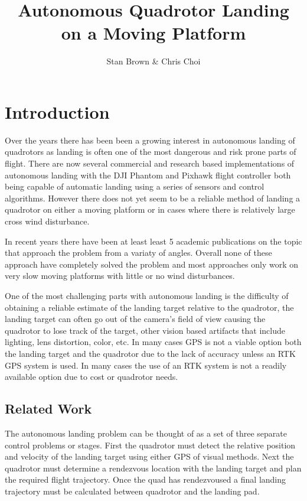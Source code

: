 \documentclass[11pt, twocolumn]{article}
\begin{document}
\title{Autonomous Quadrotor Landing on a Moving Platform}
\author{Stan Brown \& Chris Choi}
\date{}
\maketitle

\section{Introduction}
Over the years there has been been a growing interest in autonomous landing of quadrotors as landing is often one of the most dangerous and risk prone parts of flight. There are now several commercial and research based implementations of autonomous landing with the DJI Phantom and Pixhawk flight controller both being capable of automatic landing using a series of sensors and control algorithms. However there does not yet seem to be a reliable method of landing a quadrotor on either a moving platform or in cases where there is relatively large cross wind disturbance. 

In recent years there have been at least least 5 academic publications on the topic \cite{Lee2012, Kim2014, Voos2010, Friis2009, Ling2014, Herisse2012} that approach the problem from a variaty of angles. Overall none of these approach have completely solved the problem and most approaches only work on very slow moving platforms with little or no wind disturbances. 

One of the most challenging parts with autonomous landing is the difficulty of obtaining a reliable estimate of the landing target relative to the quadrotor, the landing target can often go out of the camera's field of view causing the quadrotor to lose track of the target, other vision based artifacts that include lighting, lens distortion, color, etc. In many cases GPS is not a viable option both the landing target and the quadrotor due to the lack of accuracy unless an RTK GPS system is used. In many cases the use of an RTK system is not a readily available option due to cost or quadrotor needs. 

\subsection{Related Work}
The autonomous landing problem can be thought of as a set of three separate control problems or stages. First the quadrotor must detect the relative position and velocity of the landing target using either GPS of visual methods. Next the quadrotor must determine a rendezvous location with the landing target and plan the required flight trajectory. Once the quad has rendezvoused a final landing trajectory must be calculated between quadrotor and the landing pad. 
\end{document}
